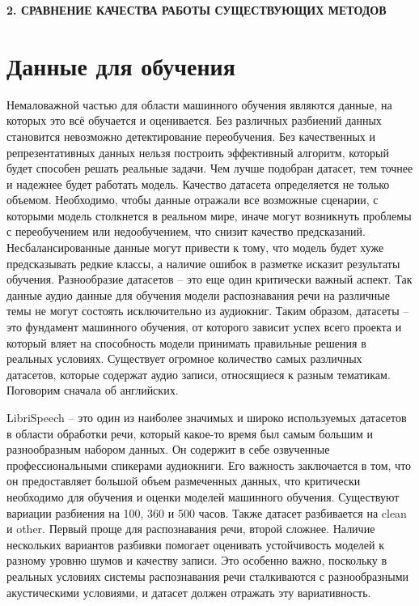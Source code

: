 \newpage
\begin{center}
  \textbf{\large 2. СРАВНЕНИЕ КАЧЕСТВА РАБОТЫ СУЩЕСТВУЮЩИХ МЕТОДОВ}
\end{center}

\section{Данные для обучения}

Немаловажной частью для области машинного обучения являются данные, на которых это всё обучается и оценивается.
Без различных разбиений данных становится невозможно детектирование переобучения.
Без качественных и репрезентативных данных нельзя построить эффективный алгоритм, который будет способен решать реальные задачи.
Чем лучше подобран датасет, тем точнее и надежнее будет работать модель.
Качество датасета определяется не только объемом.
Необходимо, чтобы данные отражали все возможные сценарии, с которыми модель столкнется в реальном мире, иначе могут возникнуть проблемы с переобучением или недообучением, что снизит качество предсказаний.
Несбалансированные данные могут привести к тому, что модель будет хуже предсказывать редкие классы, а наличие ошибок в разметке исказит результаты обучения.
Разнообразие датасетов -- это еще один критически важный аспект.
Так данные аудио данные для обучения модели распознавания речи на различные темы не могут состоять исключительно из аудиокниг.
Таким образом, датасеты -- это фундамент машинного обучения, от которого зависит успех всего проекта и который вляет на способность модели принимать правильные решения в реальных условиях.
Существует огромное количество самых различных датасетов, которые содержат аудио записи, относящиеся  к разным тематикам.
Поговорим сначала об английских.

LibriSpeech\cite{panayotov2015librispeech} -- это один из наиболее значимых и широко используемых датасетов в области обработки речи, который какое-то время был самым большим и разнообразным набором данных.
Он содержит в себе озвученные профессиональными спикерами аудиокниги.
Его важность заключается в том, что он предоставляет большой объем размеченных данных, что критически необходимо для обучения и оценки моделей машинного обучения.
Существуют вариации разбиения на 100, 360 и 500 часов.
Также датасет разбивается на clean и other.
Первый проще для распознавания речи, второй сложнее.
Наличие нескольких вариантов разбивки помогает оценивать устойчивость моделей к разному уровню шумов и качеству записи.
Это особенно важно, поскольку в реальных условиях системы распознавания речи сталкиваются с разнообразными акустическими условиями, и датасет должен отражать эту вариативность.

